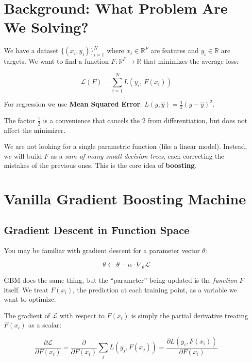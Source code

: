 \documentclass[11pt, a4paper]{article}
\begin{document}
\section{Background: What Problem Are We Solving?}

We have a dataset $\{(x_i, y_i)\}_{i=1}^N$ where $x_i \in \mathbb{R}^F$
are features and $y_i \in \mathbb{R}$ are targets.
We want to find a function $F: \mathbb{R}^F \to \mathbb{R}$ that
minimizes the average loss:

\[
\mathcal{L}(F) = \sum_{i=1}^N L\!\left(y_i,\, F(x_i)\right)
\]

For regression we use \textbf{Mean Squared Error}:
$L(y, \hat{y}) = \tfrac{1}{2}(y - \hat{y})^2$.

The factor $\tfrac{1}{2}$ is a convenience that cancels the $2$ from
differentiation, but does not affect the minimizer.

We are not looking for a single parametric function (like a linear model).
Instead, we will build $F$ as a \emph{sum of many small decision trees},
each correcting the mistakes of the previous ones.
This is the core idea of \textbf{boosting}.

\section{Vanilla Gradient Boosting Machine}

\subsection{Gradient Descent in Function Space}

You may be familiar with gradient descent for a parameter vector $\theta$:

\[
\theta \leftarrow \theta - \alpha \cdot \nabla_\theta \mathcal{L}
\]

GBM does the same thing, but the ``parameter'' being updated is the
\emph{function} $F$ itself. We treat $F(x_i)$, the prediction at each
training point, as a variable we want to optimize.

The gradient of $\mathcal{L}$ with respect to $F(x_i)$ is simply
the partial derivative treating $F(x_i)$ as a scalar:

\[
\frac{\partial \mathcal{L}}{\partial F(x_i)}
= \frac{\partial}{\partial F(x_i)} \sum_j L(y_j, F(x_j))
= \frac{\partial L(y_i, F(x_i))}{\partial F(x_i)}
\]
\end{document}

